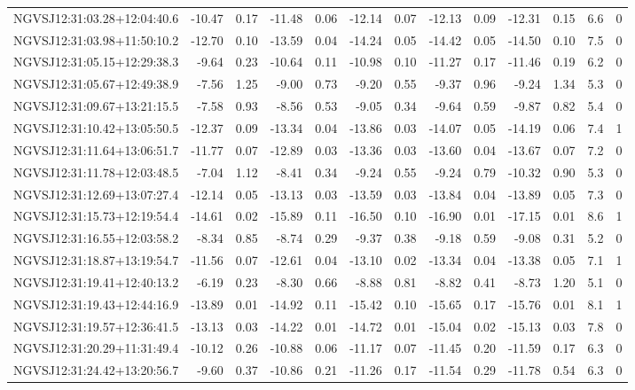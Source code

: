 \begin{tabular}{lrrrrrrrrrrcc}
NGVSJ12:31:03.28+12:04:40.6 & -10.47 & 0.17 & -11.48 & 0.06 & -12.14 & 0.07 & -12.13 & 0.09 & -12.31 & 0.15 & 6.6 & 0 \\
NGVSJ12:31:03.98+11:50:10.2 & -12.70 & 0.10 & -13.59 & 0.04 & -14.24 & 0.05 & -14.42 & 0.05 & -14.50 & 0.10 & 7.5 & 0 \\
NGVSJ12:31:05.15+12:29:38.3 & -9.64 & 0.23 & -10.64 & 0.11 & -10.98 & 0.10 & -11.27 & 0.17 & -11.46 & 0.19 & 6.2 & 0 \\
NGVSJ12:31:05.67+12:49:38.9 & -7.56 & 1.25 & -9.00 & 0.73 & -9.20 & 0.55 & -9.37 & 0.96 & -9.24 & 1.34 & 5.3 & 0 \\
NGVSJ12:31:09.67+13:21:15.5 & -7.58 & 0.93 & -8.56 & 0.53 & -9.05 & 0.34 & -9.64 & 0.59 & -9.87 & 0.82 & 5.4 & 0 \\
NGVSJ12:31:10.42+13:05:50.5 & -12.37 & 0.09 & -13.34 & 0.04 & -13.86 & 0.03 & -14.07 & 0.05 & -14.19 & 0.06 & 7.4 & 1 \\
NGVSJ12:31:11.64+13:06:51.7 & -11.77 & 0.07 & -12.89 & 0.03 & -13.36 & 0.03 & -13.60 & 0.04 & -13.67 & 0.07 & 7.2 & 0 \\
NGVSJ12:31:11.78+12:03:48.5 & -7.04 & 1.12 & -8.41 & 0.34 & -9.24 & 0.55 & -9.24 & 0.79 & -10.32 & 0.90 & 5.3 & 0 \\
NGVSJ12:31:12.69+13:07:27.4 & -12.14 & 0.05 & -13.13 & 0.03 & -13.59 & 0.03 & -13.84 & 0.04 & -13.89 & 0.05 & 7.3 & 0 \\
NGVSJ12:31:15.73+12:19:54.4 & -14.61 & 0.02 & -15.89 & 0.11 & -16.50 & 0.10 & -16.90 & 0.01 & -17.15 & 0.01 & 8.6 & 1 \\
NGVSJ12:31:16.55+12:03:58.2 & -8.34 & 0.85 & -8.74 & 0.29 & -9.37 & 0.38 & -9.18 & 0.59 & -9.08 & 0.31 & 5.2 & 0 \\
NGVSJ12:31:18.87+13:19:54.7 & -11.56 & 0.07 & -12.61 & 0.04 & -13.10 & 0.02 & -13.34 & 0.04 & -13.38 & 0.05 & 7.1 & 1 \\
NGVSJ12:31:19.41+12:40:13.2 & -6.19 & 0.23 & -8.30 & 0.66 & -8.88 & 0.81 & -8.82 & 0.41 & -8.73 & 1.20 & 5.1 & 0 \\
NGVSJ12:31:19.43+12:44:16.9 & -13.89 & 0.01 & -14.92 & 0.11 & -15.42 & 0.10 & -15.65 & 0.17 & -15.76 & 0.01 & 8.1 & 1 \\
NGVSJ12:31:19.57+12:36:41.5 & -13.13 & 0.03 & -14.22 & 0.01 & -14.72 & 0.01 & -15.04 & 0.02 & -15.13 & 0.03 & 7.8 & 0 \\
NGVSJ12:31:20.29+11:31:49.4 & -10.12 & 0.26 & -10.88 & 0.06 & -11.17 & 0.07 & -11.45 & 0.20 & -11.59 & 0.17 & 6.3 & 0 \\
NGVSJ12:31:24.42+13:20:56.7 & -9.60 & 0.37 & -10.86 & 0.21 & -11.26 & 0.17 & -11.54 & 0.29 & -11.78 & 0.54 & 6.3 & 0 \\

\end{tabular}
